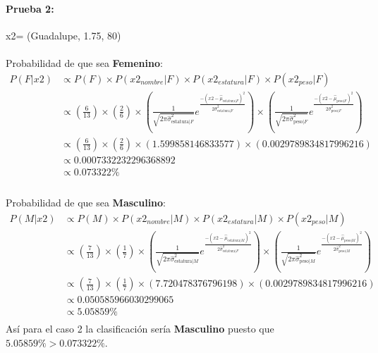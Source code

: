 \documentclass[12pt]{article}
\begin{document}
 \paragraph{Prueba 2: }x2= (Guadalupe, 1.75, 80)
 \paragraph{}Probabilidad de que sea \textbf{Femenino}:\\
 \begin{equation}
 \begin{split}
 P(F|x2) &\propto P(F) \times P(x2_{nombre}|F) \times P(x2_{estatura}|F) \times P(x2_{peso}|F) \\
 &\propto (\frac{6}{13}) \times (\frac{2}{6}) \times (\frac{1}{\sqrt{2\pi\hat{\sigma}_{\text{estatura}|F}^2}}e^{\frac{-(x2 - \hat{\mu}_{\text{estatura}|F})^2}{2\hat{\sigma}_{\text{estatura}|F}^2}}) \times (\frac{1}{\sqrt{2\pi\hat{\sigma}_{\text{peso}|F}^2}}e^{\frac{-(x2 - \hat{\mu}_{\text{peso}|F})^2}{2\hat{\sigma}_{\text{peso}|F}^2}}) \\
 &\propto (\frac{6}{13}) \times (\frac{2}{6}) \times (1.599858146833577) \times (0.0029789834817996216) \\
 &\propto 0.0007332232296368892 \\
 &\propto 0.073322\% \\
 \end{split}
 \end{equation}
 \paragraph{}Probabilidad de que sea \textbf{Masculino}:\\
 \begin{equation}
 \begin{split}
 P(M|x2) &\propto P(M) \times P(x2_{nombre}|M) \times P(x2_{estatura}|M) \times P(x2_{peso}|M) \\
 &\propto (\frac{7}{13}) \times (\frac{1}{7}) \times (\frac{1}{\sqrt{2\pi\hat{\sigma}_{\text{estatura}|M}^2}}e^{\frac{-(x2 - \hat{\mu}_{\text{estatura}|M})^2}{2\hat{\sigma}_{\text{estatura}|F}^2}}) \times (\frac{1}{\sqrt{2\pi\hat{\sigma}_{\text{peso}|M}^2}}e^{\frac{-(x2 - \hat{\mu}_{\text{peso}|M})^2}{2\hat{\sigma}_{\text{peso}|M}^2}}) \\
 &\propto (\frac{7}{13}) \times (\frac{1}{7}) \times (7.720478376796198) \times (0.0029789834817996216) \\
 &\propto 0.050585966030299065 \\
 &\propto 5.05859 \% \\
 \end{split}
 \end{equation}
 Así para el caso 2 la clasificación sería \textbf{Masculino} puesto que $5.05859\% > 0.073322\%$.\\
\end{document}
